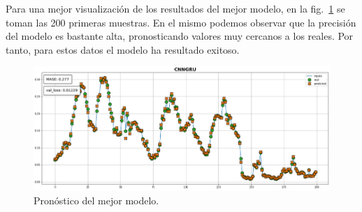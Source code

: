 \documentclass[a4paper,12pt]{article}
\begin{document}
Para una mejor visualización de los resultados del mejor modelo, en la fig.~\ref{fig:fore_best_model} se toman las 200 primeras muestras. En el mismo podemos observar que la precisión del modelo es bastante alta, pronosticando valores muy cercanos a los reales. Por tanto, para estos datos el modelo ha resultado exitoso.

\begin{figure}[H]
	\begin{center}
	\includegraphics[width=1\textwidth]{cnngru_final.png}
  	\caption{Pronóstico del mejor modelo.}
  	\label{fig:fore_best_model}
  	\end{center}
\end{figure}

\clearpage

{}

%
%
\end{document}
